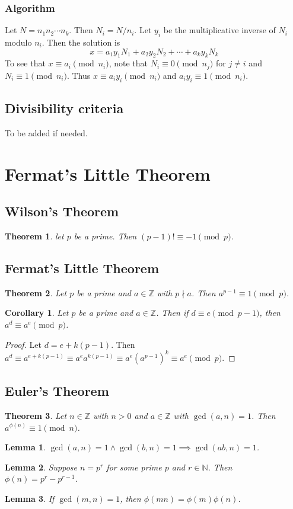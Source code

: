 \documentclass[letterpaper,12pt,oneside]{article}
\newtheorem{theorem}{Theorem}
\newtheorem*{corollary}{Corollary}
\newtheorem*{lemma}{Lemma}
\begin{document}
\subsubsection{Algorithm}
Let $N = n_1n_2\cdots n_k$. Then $N_i = N/n_i$. Let $y_i$ be the multiplicative inverse of $N_i$ modulo $n_i$. Then the solution is\[
    x = a_1y_1N_1+a_2y_2N_2+\cdots + a_ky_kN_k
\]
To see that $x\equiv a_i\pmod{n_i}$, note that $N_i\equiv 0\pmod{n_j}$ for $j\neq i$ and $N_i\equiv 1\pmod{n_i}$. Thus $x\equiv a_iy_i\pmod{n_i}$ and $a_iy_i\equiv 1\pmod{n_i}$.
\subsection{Divisibility criteria}
To be added if needed.
\section{Fermat's Little Theorem}
\subsection{Wilson's Theorem}
\begin{theorem}
    let $p$ be a prime. Then $(p-1)!\equiv -1\pmod{p}$.
\end{theorem}
\subsection{Fermat's Little Theorem}
\begin{theorem}
    Let $p$ be a prime and $a\in \mathbb{Z}$ with $p\nmid a$. Then $a^{p-1}\equiv 1\pmod{p}$.
\end{theorem}
\begin{corollary}
    Let $p$ be a prime and $a\in \mathbb{Z}$. Then if $d\equiv e\pmod{p-1}$, then $a^d\equiv a^e\pmod{p}$.
\end{corollary}
\begin{proof}
    Let $d=e+k(p-1)$. Then $a^d\equiv a^{e+k(p-1)}\equiv a^e a^{k(p-1)} \equiv a^e (a^{p-1})^k \equiv a^e\pmod{p}$.
\end{proof}

\subsection{Euler's Theorem}
\begin{theorem}
    Let $n\in \mathbb{Z}$ with $n>0$ and $a\in \mathbb{Z}$ with $\gcd(a,n) = 1$. Then $a^{\phi(n)}\equiv 1\pmod{n}$.
\end{theorem}
\begin{lemma}
    $\gcd(a,n) = 1 \land \gcd(b,n) = 1 \implies \gcd(ab,n) = 1$.
\end{lemma}
\begin{lemma}
    Suppose $n=p^r$ for some prime $p$ and $r\in \mathbb{N}$. Then $\phi(n) = p^r-p^{r-1}$.
\end{lemma}
\begin{lemma}
    If $\gcd(m,n) = 1$, then $\phi(mn) = \phi(m)\phi(n)$.
\end{lemma}
\end{document}
